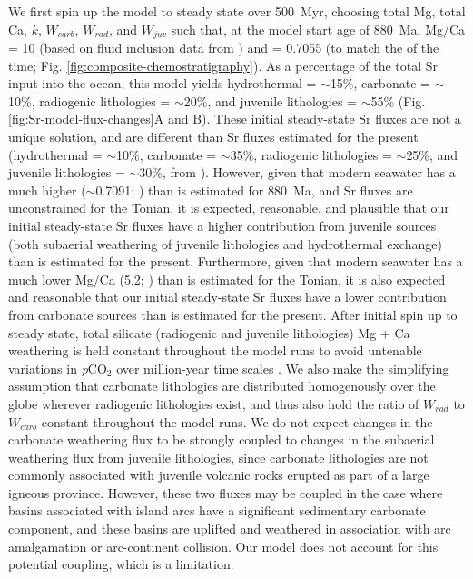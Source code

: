 We first spin up the model to steady state over 500~Myr, choosing total Mg, total Ca, $k$, $W_{carb}$, $W_{rad}$, and $W_{juv}$ such that, at the model start age of 880~Ma, Mg/Ca = 10 (based on fluid inclusion data from \citealp{Spear2014a}) and \SrSr = 0.7055 (to match the \SrSr of the time; Fig. \ref{fig:composite-chemostratigraphy}). As a percentage of the total Sr input into the ocean, this model yields hydrothermal = $\sim$15\%, carbonate = $\sim$10\%, radiogenic lithologies = $\sim$20\%, and juvenile lithologies = $\sim$55\% (Fig. \ref{fig:Sr-model-flux-changes}A and B). These initial steady-state Sr fluxes are not a unique solution, and are different than Sr fluxes estimated for the present (hydrothermal = $\sim$10\%, carbonate = $\sim$35\%, radiogenic lithologies = $\sim$25\%, and juvenile lithologies = $\sim$30\%, from \citealp{Allegre2010a}). However, given that modern seawater has a much higher \SrSr ($\sim$0.7091; \citealp{Allegre2010a}) than is estimated for 880~Ma, and Sr fluxes are unconstrained for the Tonian, it is expected, reasonable, and plausible that our initial steady-state Sr fluxes have a higher contribution from juvenile sources (both subaerial weathering of juvenile lithologies and hydrothermal exchange) than is estimated for the present. Furthermore, given that modern seawater has a much lower Mg/Ca (5.2; \citealp{Lowenstein2001a}) than is estimated for the Tonian, it is also expected and reasonable that our initial steady-state Sr fluxes have a lower contribution from carbonate sources than is estimated for the present. After initial spin up to steady state, total silicate (radiogenic and juvenile lithologies) Mg + Ca weathering is held constant throughout the model runs to avoid untenable variations in \textit{p}CO$_{2}$ over million-year time scales \citep{Berner1997a}. We also make the simplifying assumption that carbonate lithologies are distributed homogenously over the globe wherever radiogenic lithologies exist, and thus also hold the ratio of $W_{rad}$ to $W_{carb}$ constant throughout the model runs. We do not expect changes in the carbonate weathering flux to be strongly coupled to changes in the subaerial weathering flux from juvenile lithologies, since carbonate lithologies are not commonly associated with juvenile volcanic rocks erupted as part of a large igneous province. However, these two fluxes may be coupled in the case where basins associated with island arcs have a significant sedimentary carbonate component, and these basins are uplifted and weathered in association with arc amalgamation or arc-continent collision. Our model does not account for this potential coupling, which is a limitation.

